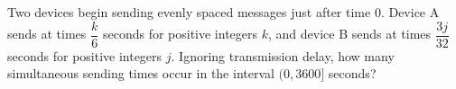 Two devices begin sending evenly spaced messages just after time $0$. Device A sends at times $\dfrac{k}{6}$ seconds for positive integers $k$, and device B sends at times $\dfrac{3j}{32}$ seconds for positive integers $j$. Ignoring transmission delay, how many simultaneous sending times occur in the interval $(0,3600]$ seconds?
